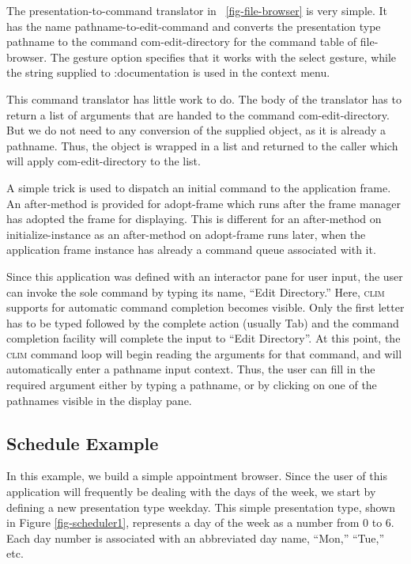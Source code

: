 \documentclass[twocolumn,a4paper]{article}
\newcommand {\code}[1]{{\sffamily #1}}
\newcommand {\CLIM}{\textsc{clim}}
\let\class\code
\let\method\code
\let\keyword\code
\begin{document}
The presentation-to-command translator in
\figurename~\ref{fig-file-browser} is very simple. It has the name
\class{pathname-to-edit-command} and converts the presentation type
\code{pathname} to the command \code{com-edit-directory} for the
command table of \class{file-browser}. The gesture option specifies
that it works with the select gesture, while the string supplied to
\keyword{:documentation} is used in the context menu.

This command translator has little work to do. The body of the
translator has to return a list of arguments that are handed to the
command \code{com-edit-directory}. But we do not need to any
conversion of the supplied object, as it is already a pathname. Thus,
the object is wrapped in a list and returned to the caller
which will apply \code{com-edit-directory} to the list.

A simple trick is used to dispatch an initial command to the
application frame. An after-method is provided for
\method{adopt-frame} which runs after the frame manager has adopted
the frame for displaying. This is different for an after-method on
\method{initialize-instance} as an after-method on
\method{adopt-frame} runs later, when the application frame instance
has already a command queue associated with it.

Since this application was defined with an interactor pane for user
input, the user can invoke the sole command by typing its name, ``Edit
Directory.'' Here, \CLIM{} supports for automatic command completion
becomes visible. Only the first letter has to be typed followed by the
complete action (usually Tab) and the command completion facility will
complete the input to ``Edit Directory''. At this point, the \CLIM{}
command loop will begin reading the arguments for that command, and
will automatically enter a pathname input context. Thus, the user can
fill in the required argument either by typing a pathname, or by
clicking on one of the pathnames visible in the display pane.

\subsection{Schedule Example}

In this example, we build a simple appointment browser. Since the user
of this application will frequently be dealing with the days of the
week, we start by defining a new presentation type weekday. This
simple presentation type, shown in Figure \ref{fig-scheduler1},
represents a day of the week as a number from 0 to 6. Each day number
is associated with an abbreviated day name, ``Mon,'' ``Tue,'' etc.
\end{document}
